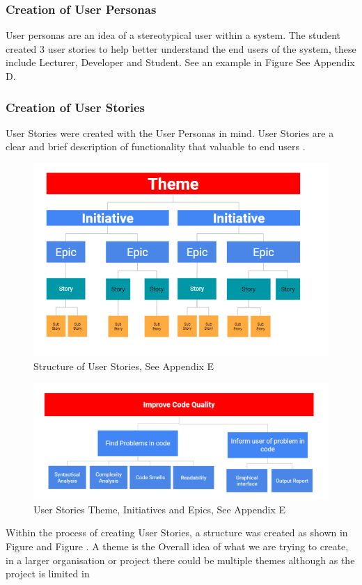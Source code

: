 \subsubsection{\textbf{Creation of User Personas}}
User personas are an idea of a stereotypical user within a system. The student created 3 user stories to help better understand the end users of the system, these include
Lecturer, Developer and Student. See an example in Figure  See Appendix D.

\subsubsection{\textbf{Creation of User Stories}}
User Stories were created with the User Personas in mind. User Stories are a clear and brief description of functionality that valuable to end users \cite{userStories}.
\begin{figure}
    \includegraphics[width=.5\textwidth]{images/user-stories-structure.png}
    \caption{Structure of User Stories, See Appendix E}
    \label{fig:userstorytheme}
\end{figure}
\begin{figure}
    \includegraphics[width=.5\textwidth]{images/user-stories-structure-filled.png}
    \caption{User Stories Theme, Initiatives and Epics, See Appendix E}
    \label{fig:userstories}
\end{figure}
Within the process of creating User Stories, a structure was created as shown in Figure  and Figure .
A theme is the Overall idea of what we are trying to create, in a larger organisation or project there could be multiple themes although as the project is limited in 
